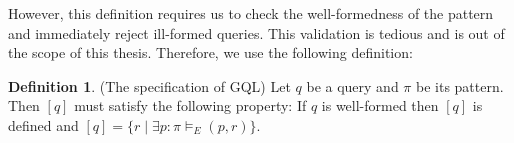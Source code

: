 \documentclass[14pt]{constructor-thesis}
\theoremstyle{definition}
\newtheorem*{definition}{Definition}
\begin{document}
However, this definition requires us to check the well-formedness of the pattern and immediately reject ill-formed queries. This validation is tedious and is out of the scope of this thesis. Therefore, we use the following definition:

\begin{definition}(The specification of GQL)
  Let $q$ be a query and $\pi$ be its pattern. Then $[q]$ must satisfy the following property:
  If $q$ is well-formed then $[q]$ is defined and $[q] = \{ r \mid \exists p : \pi \models_E (p, r) \}$.
\end{definition}



\end{document}
